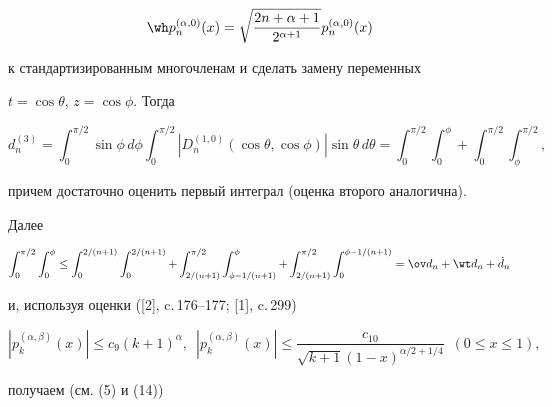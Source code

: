\begin{equation}


\wh p_n^{(\alpha,0)}(x)=\sqrt{\frac{2n+\alpha+1}{2^{\alpha+1}}}


p_n^{(\alpha,0)}(x)


\end{equation}


к стандартизированным многочленам и сделать замену переменных


$t=\cos \theta$, $z=\cos \phi$. Тогда


$$


d_n^{(3)}=\int_0^{\pi /2} \sin \phi\, d\phi


\int_0^{\pi /2}|D_n^{(1,0)}(\cos \theta, \cos \phi)|


\sin \theta\, d\theta =


\int_0^{\pi /2} \int_0^\phi +\int_0^{\pi /2}


\int_\phi^{\pi /2},


$$


причем достаточно оценить первый интеграл (оценка второго аналогична).


Далее


\begin{equation}


\int_0^{\pi /2}\int_0^\phi


\le \int_0^{2/(n+1)}\int_0^{2/(n+1)}+


\int_{2/(n+1)}^{\pi /2} \int_{\phi -1/(n+1)}^\phi +


\int_{2/(n+1)}^{\pi /2} \int_0^{\phi -1/(n+1)}


=\ov d_n +\wt d_n+\Dot d_n


\end{equation}


и, используя оценки ([2], c.\,176--177; [1], c.\,299)


\begin{equation}


|p_k^{(\alpha,\beta)} (x)|\le c_9  (k+1)^\alpha,\ \;


|p_k^{(\alpha,\beta)} (x)|\le \frac{c_{10}}{\sqrt {k+1}


(1-x)^{{\alpha}/{2}+{1}/{4}} }\ \; (0\le x\le 1),


\end{equation}


получаем (см. (5) и (14))


